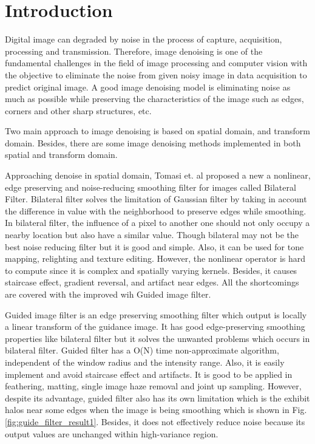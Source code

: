 \section{Introduction}

Digital image can degraded by noise in the process of capture, acquisition, processing and transmission. Therefore, image denoising is one of the fundamental challenges in the field of image processing and computer vision with the objective to eliminate the noise from given noisy image in data acquisition to predict original image. A good image denoising model is eliminating noise as much as possible while preserving the characteristics of the image such as edges, corners and other sharp structures, etc.\cite{Motwani2004}

Two main approach to image denoising is based on spatial domain, and transform domain. Besides, there are some image denoising methods implemented in both spatial and transform domain.

Approaching denoise in spatial domain, Tomasi et. al \cite{Tomasi1998} proposed a new a nonlinear, edge preserving and noise-reducing smoothing filter for images called Bilateral Filter. Bilateral filter \cite{Paris2008} solves the limitation of Gaussian filter \cite{Gonzalez06DIP} by taking in account the difference in value with the neighborhood to preserve edges while smoothing.  In bilateral filter, the influence of a pixel to another one should not only occupy a nearby location but also have a similar value. Though bilateral may not be the best noise reducing filter but it is good and simple. Also, it can be used for tone mapping, relighting and texture editing. However, the nonlinear operator is hard to compute since it is complex and spatially varying kernels. Besides, it causes staircase effect, gradient reversal, and artifact near edges. All the shortcomings are covered with the improved wih Guided image filter.

Guided image filter \cite{He2013} is an edge preserving smoothing filter which output is locally a linear transform of the guidance image. It has good edge-preserving smoothing properties like bilateral filter but it solves the unwanted problems which occurs in bilateral filter. Guided filter has a O(N) time non-approximate algorithm, independent of the window radius and the intensity range. Also, it is easily implement and avoid staircase effect and artifacts. It is good to be applied in feathering, matting, single image haze removal and joint up sampling. However, despite its advantage, guided filter also has its own limitation which is the exhibit halos near some edges when the image is being smoothing which is shown in Fig.\ref{fig:guide_filter_result1}. Besides, it does not effectively reduce noise because its output values are unchanged within high-variance region.

